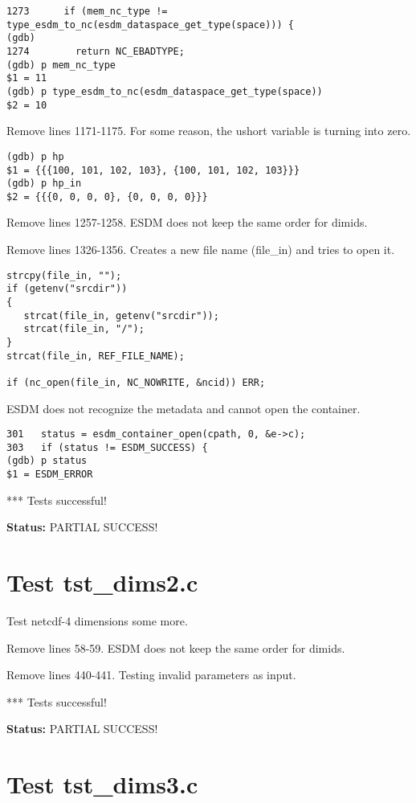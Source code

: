\begin{verbatim}
1273	  if (mem_nc_type != type_esdm_to_nc(esdm_dataspace_get_type(space))) {
(gdb)
1274	    return NC_EBADTYPE;
(gdb) p mem_nc_type
$1 = 11
(gdb) p type_esdm_to_nc(esdm_dataspace_get_type(space))
$2 = 10
\end{verbatim}

Remove lines 1171-1175. For some reason, the ushort variable is turning into zero.

\begin{verbatim}
(gdb) p hp
$1 = {{{100, 101, 102, 103}, {100, 101, 102, 103}}}
(gdb) p hp_in
$2 = {{{0, 0, 0, 0}, {0, 0, 0, 0}}}
\end{verbatim}

Remove lines 1257-1258. ESDM does not keep the same order for dimids.

Remove lines 1326-1356. Creates a new file name (file\_in) and tries to open it.

\begin{verbatim}
strcpy(file_in, "");
if (getenv("srcdir"))
{
   strcat(file_in, getenv("srcdir"));
   strcat(file_in, "/");
}
strcat(file_in, REF_FILE_NAME);

if (nc_open(file_in, NC_NOWRITE, &ncid)) ERR;
\end{verbatim}

ESDM does not recognize the metadata and cannot open the container.

\begin{verbatim}
301	  status = esdm_container_open(cpath, 0, &e->c);
303	  if (status != ESDM_SUCCESS) {
(gdb) p status
$1 = ESDM_ERROR
\end{verbatim}

*** Tests successful!

{\bf \large Status: } PARTIAL SUCCESS!

\section{Test tst\_dims2.c}

Test netcdf-4 dimensions some more.

Remove lines 58-59. ESDM does not keep the same order for dimids.

Remove lines 440-441. Testing invalid parameters as input.

*** Tests successful!

{\bf \large Status: } PARTIAL SUCCESS!

\section{Test tst\_dims3.c}

